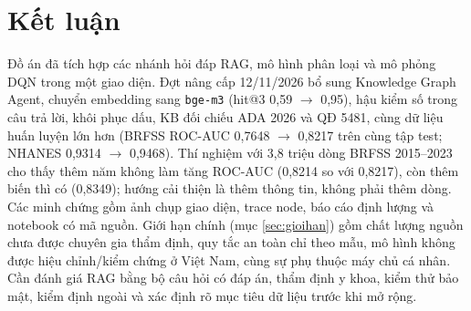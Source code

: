 \documentclass[12pt,a4paper]{article}
\renewcommand{\_}{\textunderscore\allowbreak}\setlength{\emergencystretch}{3em}
\begin{document}


\section{Kết luận}
Đồ án đã tích hợp các nhánh hỏi đáp RAG, mô hình phân loại và mô phỏng DQN trong một giao diện. Đợt nâng cấp 12/11/2026 bổ sung Knowledge Graph Agent, chuyển embedding sang \texttt{bge-m3} (hit@3 0,59 $\rightarrow$ 0,95), hậu kiểm số trong câu trả lời, khôi phục dấu, KB đối chiếu ADA 2026 và QĐ 5481, cùng dữ liệu huấn luyện lớn hơn (BRFSS ROC-AUC 0,7648 $\rightarrow$ 0,8217 trên cùng tập test; NHANES 0,9314 $\rightarrow$ 0,9468). Thí nghiệm với 3,8 triệu dòng BRFSS 2015--2023 cho thấy thêm năm không làm tăng ROC-AUC (0,8214 so với 0,8217), còn thêm biến thì có (0,8349); hướng cải thiện là thêm thông tin, không phải thêm dòng. Các minh chứng gồm ảnh chụp giao diện, trace node, báo cáo định lượng và notebook có mã nguồn. Giới hạn chính (mục \ref{sec:gioihan}) gồm chất lượng nguồn chưa được chuyên gia thẩm định, quy tắc an toàn chỉ theo mẫu, mô hình không được hiệu chỉnh/kiểm chứng ở Việt Nam, cùng sự phụ thuộc máy chủ cá nhân. Cần đánh giá RAG bằng bộ câu hỏi có đáp án, thẩm định y khoa, kiểm thử bảo mật, kiểm định ngoài và xác định rõ mục tiêu dữ liệu trước khi mở rộng.
\end{document}
